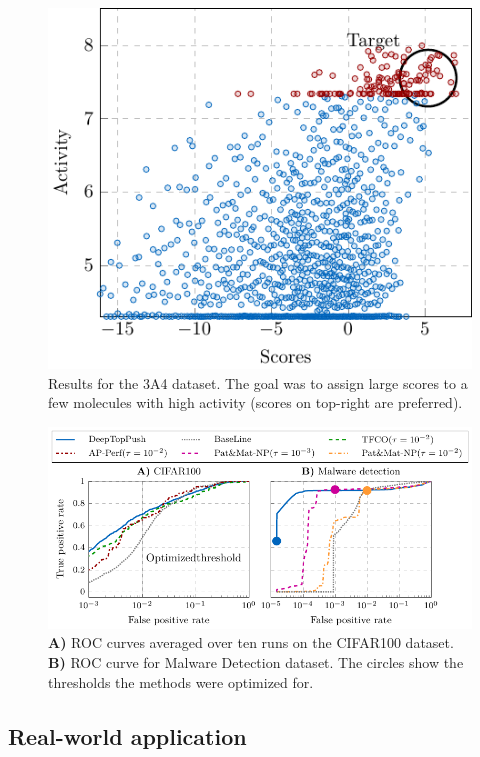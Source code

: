 \begin{figure}[!ht]
  \centering
  \includegraphics[width = \linewidth]{images/deep_molecules.pdf}
  \caption{Results for the 3A4 dataset. The goal was to assign large scores to a few molecules with high activity (scores on top-right are preferred).}
  \label{fig:molecules}
\end{figure}

\begin{figure}[!ht]
  \centering
  \includegraphics[width = \linewidth]{images/deep_results1.pdf}
  \caption{\textbf{A)} ROC curves averaged over ten runs on the CIFAR100 dataset. \textbf{B)} ROC curve for Malware Detection dataset. The circles show the thresholds the methods were optimized for.}
  \label{fig: roc curves}
\end{figure}

\subsection{Real-world application}

